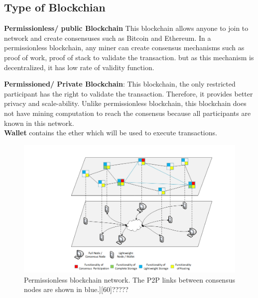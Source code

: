 \subsection{Type of Blockchian}

\textbf{Permissionless/ public Blockchain} This blockchain allows anyone to join to network and create consensuses such as Bitcoin and Ethereum. In a permissionless blockchain, any miner can create consensus mechanisms such as proof of work, proof of stack to validate the transaction. but as this mechanism is decentralized, it has low rate of validity function\cite{Kalra}.

\textbf{Permissioned/ Private Blockchain}: This blockchain, the only restricted participant has the right to validate the transaction. Therefore, it provides better privacy and scale-ability. Unlike permissionless blockchain, this blockchain does not have mining computation to reach the consensus because all participants are known in this network\cite{Kalra}. \\
\textbf{Wallet} contains the ether which will be used to execute transactions\cite{Egbertsen}. \\
\begin{center}
	\begin{figure}[htb!]
		
		\begin{minipage}{0.45\linewidth}
			\centering
			\includegraphics[width=1.85\textwidth]{images/chap01_P2P.png}
		\end{minipage}
		\caption{Permissionless blockchain network. The P2P links between consensus nodes are shown in blue.]{[60]?????}}
		
	\end{figure}
	
\end{center}

